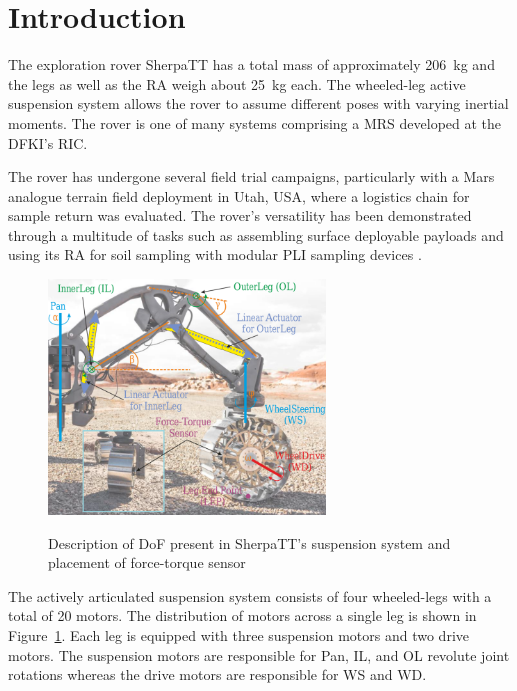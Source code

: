 \documentclass[twocolumn,letterpaper]{IEEEAerospaceCLS}  %
\newcommand{\refFig}[1]{{Figure}~\ref{#1}} %
\begin{document}

\section{Introduction}
The exploration rover SherpaTT has a total mass of approximately \SI{206}{\kilo\gram} and the legs as well as the \ac{RA} weigh about \SI{25}{\kilo\gram} each. The wheeled-leg active suspension system allows the rover to assume different poses with varying inertial moments. The rover is one of many systems comprising a \ac{MRS} developed at the \ac{DFKI}'s \ac{RIC}.

The rover has undergone several field trial campaigns, particularly with a Mars analogue terrain field deployment in Utah, USA, where a logistics chain for sample return was evaluated. The rover's versatility has been demonstrated through a multitude of tasks such as assembling surface deployable payloads and using its \ac{RA} for soil sampling with modular \ac{PLI} sampling devices \cite{Cordes2018b}.

\begin{figure}[h]
  \centering
  \includegraphics[width=2.9in]{figures/images/sherpatt-actively-articulated-suspension-sytem.png}\\
  \caption{Description of DoF present in SherpaTT’s
suspension system and placement of force-torque sensor}
  \label{fig:sherpatt-actively-articulated-suspension-system}
\end{figure}

The actively articulated suspension system consists of four wheeled-legs with a total of 20 motors. The distribution of motors across a single leg is shown in \refFig{fig:sherpatt-actively-articulated-suspension-system}. Each leg is equipped with three suspension motors and two drive motors. The suspension motors are responsible for Pan, \ac{IL}, and \ac{OL} revolute joint rotations whereas the drive motors are responsible for \ac{WS} and \ac{WD}.
\end{document}
